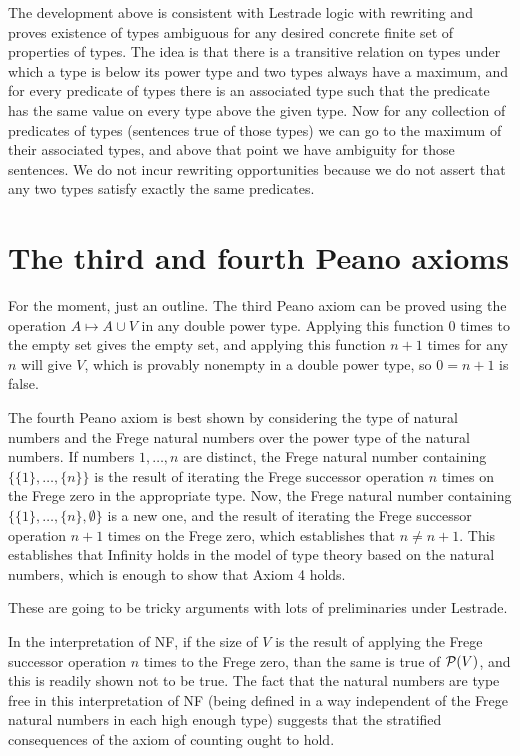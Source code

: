 \documentclass[12pt]{article}
\begin{document}
The development above is consistent with Lestrade logic with rewriting and proves existence of types ambiguous for any desired concrete finite set of properties of types.  The idea is that there is a transitive relation on types under which a type is below its power type and two types always have a maximum, 
and for every predicate of types there is an associated type such that the predicate has the same value on every type above the given type.  Now for any
collection of predicates of types (sentences true of those types) we can go to the maximum of their associated types, and above that point we have ambiguity for those sentences.  We do not incur rewriting opportunities because we do not assert that any two types satisfy exactly the same predicates.

\section{The third and fourth Peano axioms}

For the moment, just an outline.  The third Peano axiom can be proved using the operation $A \mapsto A \cup V$ in any double power type.  Applying this function 0 times to the empty set gives the empty set, and applying this function $n+1$ times for any $n$ will give $V$, which is provably nonempty in a double power type, so $0=n+1$ is false.

The fourth Peano axiom is best shown by considering the type of natural numbers and the Frege natural numbers over the power type of the natural numbers.  If numbers $1,\ldots,n$ are distinct, the Frege natural number containing $\{\{1\},\ldots,\{n\}\}$ is the result of iterating the Frege successor operation $n$ times on the Frege zero in the appropriate type.  Now, the Frege natural number containing $\{\{1\},\ldots,\{n\},\emptyset\}$ is a new one, and the result of iterating the Frege successor operation $n+1$ times on the Frege zero, which establishes that $n \neq n+1$.   This establishes that Infinity holds in the model of type theory based on the natural numbers, which is enough to show that Axiom 4 holds.

These are going to be tricky arguments with lots of preliminaries under Lestrade.

In the interpretation of NF, if the size of $V$ is the result of applying the Frege successor operation $n$ times to the Frege zero, than the same is true of ${\cal  P}(V)$, and this is readily shown not to be true.  The fact that the natural numbers are type free in this interpretation of NF (being defined in a way independent of the Frege natural numbers in each high enough type) suggests that the stratified consequences of the axiom of counting ought to hold.
\end{document}

